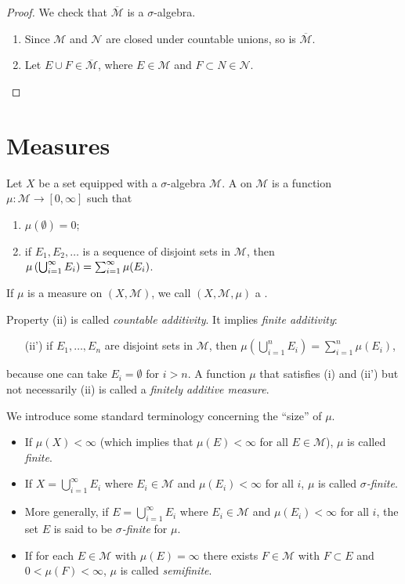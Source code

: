 \begin{proof}
We check that $\overline{\mathcal{M}}$ is a $\sigma$-algebra.
\begin{enumerate}[label=(\roman*)]
\item Since $\mathcal{M}$ and $\mathcal{N}$ are closed under countable unions, so is $\overline{\mathcal{M}}$.
\item Let $E\cup F\in\overline{\mathcal{M}}$, where $E\in\mathcal{M}$ and $F\subset N\in\mathcal{N}$.
\end{enumerate}
\end{proof}
\pagebreak

\section{Measures}
\begin{definition}[Measure]
Let $X$ be a set equipped with a $\sigma$-algebra $\mathcal{M}$.
A  on $\mathcal{M}$ is a function $\mu\colon\mathcal{M}\to[0,\infty]$ such that
\begin{enumerate}[label=(\roman*)]
\item $\mu(\emptyset)=0$;
\item if $E_1,E_2,\dots$ is a sequence of disjoint sets in $\mathcal{M}$, then $\mu\left(\bigcup_{i=1}^{\infty}E_i\right)=\sum_{i=1}^{\infty}\mu(E_i)$.
\end{enumerate}
If $\mu$ is a measure on $(X,\mathcal{M})$, we call $(X,\mathcal{M},\mu)$ a .
\end{definition}

Property (ii) is called \emph{countable additivity}. It implies \emph{finite additivity}:
\begin{enumerate}
\item[(ii')] if $E_1,\dots,E_n$ are disjoint sets in $\mathcal{M}$, then $\mu(\bigcup_{i=1}^{n}E_i)=\sum_{i=1}^{n}\mu(E_i)$,
\end{enumerate}
because one can take $E_i=\emptyset$ for $i>n$. A function $\mu$ that satisfies (i) and (ii') but not necessarily (ii) is called a \emph{finitely additive measure}.

We introduce some standard terminology concerning the ``size'' of $\mu$.
\begin{itemize}
\item If $\mu(X)<\infty$ (which implies that $\mu(E)<\infty$ for all $E\in\mathcal{M}$), $\mu$ is called \emph{finite}.
\item If $X=\bigcup_{i=1}^{\infty}E_i$ where $E_i\in\mathcal{M}$ and $\mu(E_i)<\infty$ for all $i$, $\mu$ is called \emph{$\sigma$-finite}.
\item More generally, if $E=\bigcup_{i=1}^{\infty}E_i$ where $E_i\in\mathcal{M}$ and $\mu(E_i)<\infty$ for all $i$, the set $E$ is said to be \emph{$\sigma$-finite} for $\mu$.
\item If for each $E\in\mathcal{M}$ with $\mu(E)=\infty$ there exists $F\in\mathcal{M}$ with $F\subset E$ and $0<\mu(F)<\infty$, $\mu$ is called \emph{semifinite}.
\end{itemize}

